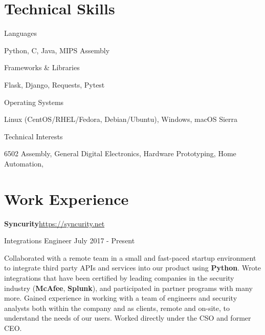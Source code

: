 \documentclass[margin,line]{resume}
\newcommand{\rurl}[1]{\hfill {\footnotesize \url{#1}}}
\begin{document}
\begin{resume}
\section{\mysidestyle Technical Skills}
	\begin{compactdesc}
		\item[Languages] \begin{inparaenum} { \small
			Python, C, Java, MIPS Assembly
		} \end{inparaenum}
        \item[Frameworks \& Libraries] \begin{inparaenum} { \small
        	Flask, Django, Requests, Pytest
        } \end{inparaenum}
		\item[Operating Systems] \begin{inparaenum} { \small
			Linux (CentOS/RHEL/Fedora, Debian/Ubuntu), Windows, macOS Sierra
		} \end{inparaenum}
        \item[Technical Interests] \begin{inparaenum} { \small
			6502 Assembly, General Digital Electronics, Hardware Prototyping, Home Automation,
        } \end{inparaenum}
        \normalsize
	\end{compactdesc}

\section{\mysidestyle Work Experience}
	\begin{asparablank}
		\item{\bf Syncurity}\rurl{https://syncurity.net}
		\small \item Integrations Engineer \hfill July 2017 - Present
		\linebreak

		\small Collaborated with a remote team in a small and fast-paced startup environment to integrate third party APIs and services into our product using \textbf{Python}.
		\small Wrote integrations that have been certified by leading companies in the security industry (\textbf{McAfee}, \textbf{Splunk}), and participated in partner programs with many more.
		\small Gained experience in working with a team of engineers and security analysts both within the company and as clients, remote and on-site, to understand the needs of our users.
		\small Worked directly under the CSO and former CEO.
	\end{asparablank}


\end{resume}
\end{document}
